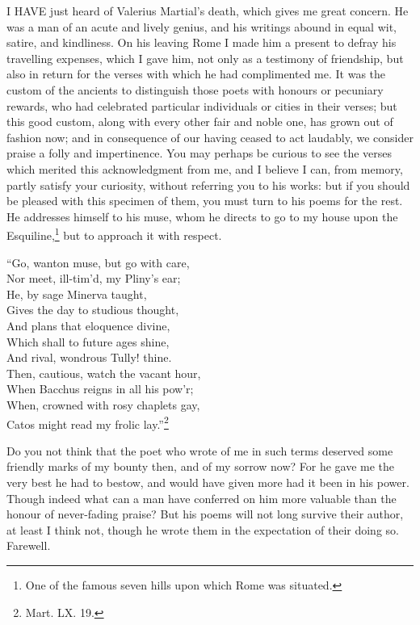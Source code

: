 
I HAVE just heard of Valerius Martial's death, which gives me great
concern. He was a man of an acute and lively genius, and his writings
abound in equal wit, satire, and kindliness. On his leaving Rome I made
him a present to defray his travelling expenses, which I gave him, not
only as a testimony of friendship, but also in return for the verses with
which he had complimented me. It was the custom of the ancients to
distinguish those poets with honours or pecuniary rewards, who had
celebrated particular individuals or cities in their verses; but this good
custom, along with every other fair and noble one, has grown out of
fashion now; and in consequence of our having ceased to act laudably, we
consider praise a folly and impertinence. You may perhaps be curious to
see the verses which merited this acknowledgment from me, and I believe I
can, from memory, partly satisfy your curiosity, without referring you to
his works: but if you should be pleased with this specimen of them, you
must turn to his poems for the rest. He addresses himself to his muse,
whom he directs to go to my house upon the Esquiline,\footnote{One of the famous seven
hills upon which Rome was situated.} but to approach it with
respect.

``Go, wanton muse, but go with care,\\
Nor meet, ill-tim'd, my Pliny's ear;\\
He, by sage Minerva taught,\\
Gives the day to studious thought,\\
And plans that eloquence divine,\\
Which shall to future ages shine,\\
And rival, wondrous Tully! thine.\\
Then, cautious, watch the vacant hour,\\
When Bacchus reigns in all his pow'r;\\
When, crowned with rosy chaplets gay,\\
Catos might read my frolic lay.''\footnote{Mart. LX. 19.}

Do you not think that the poet who wrote of me in such terms deserved some
friendly marks of my bounty then, and of my sorrow now? For he gave me the
very best he had to bestow, and would have given more had it been in his
power. Though indeed what can a man have conferred on him more valuable
than the honour of never-fading praise? But his poems will not long
survive their author, at least I think not, though he wrote them in the
expectation of their doing so. Farewell.

